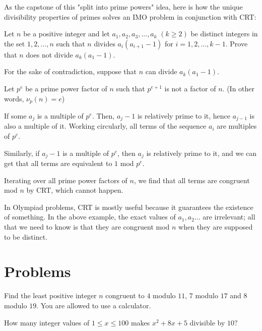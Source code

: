 \documentclass[mast]{lucky}
\begin{document}
As the capstone of this "split into prime powers" idea, here is how the unique divisibility properties of primes solves an IMO problem in conjunction with CRT:
\begin{exam}[IMO 2009/1]
Let $ n$ be a positive integer and let $ a_1,a_2,a_3,\ldots,a_k$ $ ( k\ge 2)$ be distinct integers in the set $ { 1,2,\ldots,n}$ such that $ n$ divides $ a_i(a_{i + 1} - 1)$ for $ i = 1,2,\ldots,k - 1$. Prove that $ n$ does not divide $ a_k(a_1 - 1).$
\end{exam}
\begin{sol}
For the sake of contradiction, suppose that $ n$ can divide $ a_k(a_1 - 1).$

Let $p^{e}$ be a prime power factor of $n$ such that $p^{e+1}$ is not a factor of $n$. (In other words, $\nu_{p}(n)=e$)

If some $a_j$ is a multiple of $p^{e}$. Then, $a_j-1$ is relatively prime to it, hence $a_{j-1}$ is also a multiple of it. Working circularly, all terms of the sequence ${a_i}$ are multiples of $p^e$.

Similarly, if $a_j-1$ is a multiple of $p^e$, then $a_j$ is relatively prime to it, and we can get that all terms are equivalent to $1$ mod $p^e$.

Iterating over all prime power factors of $n$, we find that all terms are congruent mod $n$ by CRT, which cannot happen.
\end{sol}
In Olympiad problems, CRT is mostly useful because it guarantees the existence of something. In the above example, the exact values of $a_1,a_2\ldots$ are irrelevant; all that we need to know is that they are congruent mod $n$ when they are supposed to be distinct.
\pagebreak
\section{Problems}

\begin{prob}[]{1}
Find the least positive integer $n$ congruent to $4$ modulo $11$, $7$ modulo $17$ and $8$ modulo $19$. You are allowed to use a calculator.
\end{prob}
\begin{prob}{1}
How many integer values of $1\leq x\leq 100$ makes $x^2+8x+5$ divisible by $10?$
\end{prob}
\end{document}
